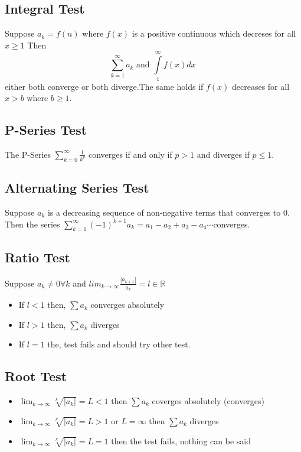 \documentclass[12pt]{article}
\begin{document}
\subsection{Integral Test}
Suppose $a_k = f(n)$ where $f(x)$ is a positive continuous which decreses for all $x \geq 1$ Then
\[
\sum_{k=1}^{\infty} a_k \text{ and } \int\limits_1^\infty f(x) dx
\
\]
either both converge or both diverge.The same holds if $f(x)$ decreases for all $x > b$ where $b \geq 1$.
\subsection{P-Series Test}
The P-Series $\displaystyle\sum_{k=0}^{\infty}\frac{1}{k^p}$ converges if and only if $p>1$ and diverges if $p\le1$.
\subsection{Alternating Series Test}
Suppose ${a_k}$ is a decreasing sequence of non-negative terms that converges to 0. Then the series $\displaystyle\sum_{k=1}^{\infty}(-1)^{k+1}a_k=a_1-a_2+a_3-a_4\cdots$converges.
\subsection{Ratio Test}
Suppose $a_k\ne 0 \forall k$ and $lim_{k\rightarrow\infty}\frac{|a_{k+1}|}{a_k}=l\in\mathbb{R}$
\begin{itemize}
\item If $l<1$ then, $\sum a_k$ converges absolutely
\item If $l>1$ then, $\sum a_k$ diverges
\item If $l=1$ the, test fails and should try other test.
\end{itemize}
\subsection{Root Test}
\begin{itemize}
\item $\lim_{k \to \infty} \sqrt[k]{|a_k|} = L < 1$ then $\sum a_k$ coverges absolutely (converges)
\item $\lim_{k \to \infty} \sqrt[k]{|a_k|} = L > 1$ or $L = \infty$ then $\sum a_k$ diverges
\item $\lim_{k \to \infty} \sqrt[k]{|a_k|} = L = 1$ then the test fails, nothing can be said
\end{itemize}
\end{document}
